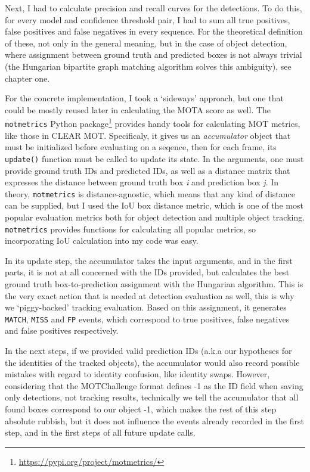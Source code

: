 Next, I had to calculate precision and recall curves for the detections. To do this, for every model and confidence threshold pair, I had to sum all true positives, false positives and false negatives in every sequence. For the theoretical definition of these, not only in the general meaning, but in the case of object detection, where assignment between ground truth and predicted boxes is not always trivial (the Hungarian bipartite graph matching algorithm solves this ambiguity), see chapter one.

For the concrete implementation, I took a `sideways' approach, but one that could be mostly reused later in calculating the MOTA score as well. The \verb|motmetrics| Python package\footnote{\url{https://pypi.org/project/motmetrics/}} provides handy tools for calculating MOT metrics, like those in CLEAR MOT. Specificaly, it gives us an \textit{accumulator} object that must be initialized before evaluating on a seqence, then for each frame, its \verb|update()| function must be called to update its state. In the arguments, one must provide ground truth IDs and predicted IDs, as well as a distance matrix that expresses the distance between ground truth box \textit{i} and prediction box \textit{j}. In theory, \verb|motmetrics| is distance-agnostic, which means that any kind of distance can be supplied, but I used the IoU box distance metric, which is one of the most popular evaluation metrics both for object detection and multiple object tracking. \verb|motmetrics| provides functions for calculating all popular metrics, so incorporating IoU calculation into my code was easy.

In its update step, the accumulator takes the input arguments, and in the first parts, it is not at all concerned with the IDs provided, but calculates the best ground truth box-to-prediction assignment with the Hungarian algorithm. This is the very exact action that is needed at detection evaluation as well, this is why we `piggy-backed' tracking evaluation. Based on this assignment, it generates \verb|MATCH|, \verb|MISS| and \verb|FP| events, which correspond to true positives, false negatives and false positives respectively.

In the next steps, if we provided valid prediction IDs (a.k.a our hypotheses for the identities of the tracked objects), the accumulator would also record possible mistakes with regard to identity confusion, like identity swaps. However, considering that the MOTChallenge format defines -1 as the ID field when saving only detections, not tracking results, technically we tell the accumulator that all found boxes correspond to our object -1, which makes the rest of this step absolute rubbish, but it does not influence the events already recorded in the first step, and in the first steps of all future update calls.

